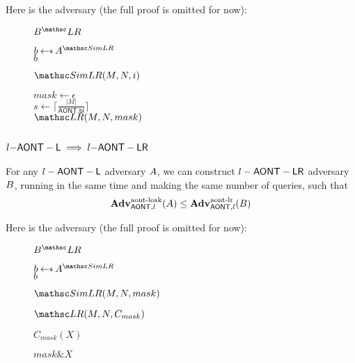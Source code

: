 \documentclass[11pt,twoside]{article}
\begin{document}
Here is the adversary (the full proof is omitted for now):

\begin{figure}[H]
{
\underline{$\advB^\LRO$}

\begin{algorithm}[H]
$b\getsr \advA^{\procfont{SimLR}}$\\
\Return $b$
\end{algorithm}

\underline{$\procfont{SimLR}(M,N,i)$}

\begin{algorithm}[H]
$mask\gets \epsilon$\\
$s\gets \lceil\frac{|M|}{\mathsf{AONT.bl}}\rceil$\\
{
}
\Return $\LRO(M,N,mask)$
\end{algorithm}
}
\end{figure}

\subsection{$l\mathsf{-AONT-L}\implies l\mathsf{-AONT-LR}$}

\begin{theorem}
For any $l-\mathsf{AONT-L}$ adversary $A$, we can construct $l-\mathsf{AONT-LR}$ adversary $B$, running in the same time and making the same number of queries, such that $$\textbf{Adv}^\text{aont-leak}_{\mathsf{AONT},l}(A)\le\textbf{Adv}^\text{aont-lr}_{\mathsf{AONT},l}(B)$$
\end{theorem}

Here is the adversary (the full proof is omitted for now):

\begin{figure}[H]
{
\underline{$\advB^\LRO$}

\begin{algorithm}[H]
$b\getsr \advA^{\procfont{SimLR}}$\\
\Return $b$
\end{algorithm}

\underline{$\procfont{SimLR}(M,N,mask)$}

\begin{algorithm}[H]
\Return $\LRO(M,N,C_{mask})$
\end{algorithm}

\underline{$C_{mask}(X)$}

\begin{algorithm}[H]
\Return $mask \mathrel{\&} X$
\end{algorithm}
}
\end{figure}
\end{document}
